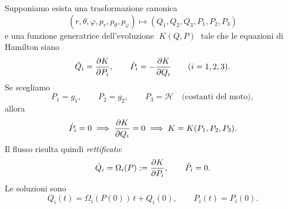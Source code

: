 Supponiamo esista una trasformazione canonica
\begin{equation}
    (r,\theta,\varphi,p_r,p_\theta,p_\varphi)\longmapsto (Q_1,Q_2,Q_3,P_1,P_2,P_3)
\end{equation}
e una funzione generatrice dell’evoluzione $\;K(Q,P)\;$ tale che le equazioni di Hamilton siano
\begin{equation}
    \dot{Q}_i=\pdv{K}{P_i},\qquad \dot{P}_i=-\pdv{K}{Q_i}\qquad (i=1,2,3).
\end{equation}
Se scegliamo
\begin{equation}
    P_1=g_1,\qquad P_2=g_2,\qquad P_3=\mathcal{H} \quad \text{(costanti del moto)},
\end{equation}
allora
\begin{equation}
    \dot{P}_i=0 \implies \pdv{K}{Q_i}=0 \implies K=K(P_1,P_2,P_3).
\end{equation}
Il flusso risulta quindi \textit{rettificato}:
\begin{equation}
    \dot{Q}_i=\Omega_i(P):=\pdv{K}{P_i},\qquad \dot{P}_i=0.
\end{equation}
Le soluzioni sono
\begin{equation}
    Q_i(t)=\Omega_i(P(0))\,t+Q_i(0),\qquad P_i(t)=P_i(0).
\end{equation}
